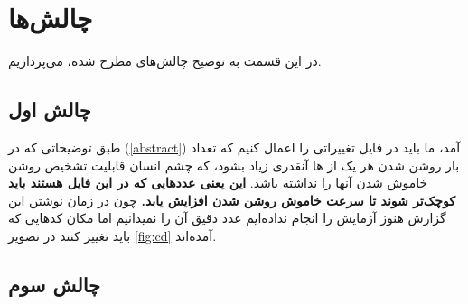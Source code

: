 \documentclass[dvipsnames, svgnames, x11names, a4paper, 11pt]{article}
\begin{document}
\section{چالش‌ها}
در این قسمت به توضیح چالش‌های مطرح شده، می‌پردازیم.

\subsection{چالش اول}
طبق توضیحاتی که در 
(\ref{abstract})
آمد، ما باید در فایل 
تغییراتی را اعمال کنیم که تعداد بار روشن شدن هر یک از 
ها
آنقدری زیاد بشود، که چشم انسان قابلیت تشخیص روشن خاموش شدن آنها را نداشته باشد.
\textbf{این یعنی عدد‌هایی که در این فایل‌ هستند باید کوچک‌تر شوند تا سرعت خاموش روشن شدن افزایش یابد.}
چون در زمان نوشتن این گزارش هنوز آزمایش را انجام نداده‌ایم عدد دقیق آن را نمیدانیم اما مکان‌ کد‌هایی که باید تغییر کنند در تصویر
\ref{fig:cd}
آمده‌اند.
\subsection{چالش سوم}

\begin{figure}[b]
\begin{center}
\end{center}
\end{figure}
\listoffigures
\end{document}
